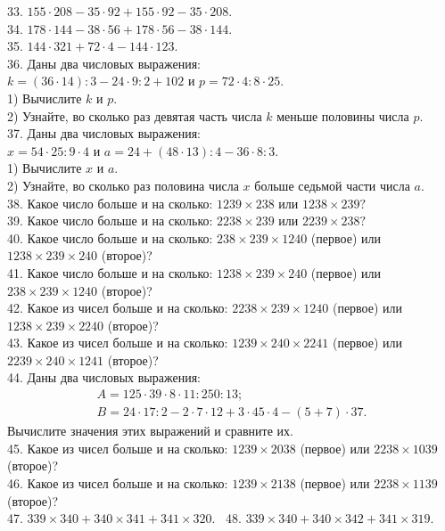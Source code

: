 \documentclass[12pt]{article}
\begin{document}
33. $155\cdot208-35\cdot92+155\cdot92-35\cdot208.$\\
34. $178\cdot144-38\cdot56+178\cdot56-38\cdot144.$\\
35. $144\cdot321+72\cdot4-144\cdot123.$\\
36. Даны два числовых выражения:\\
$k=(36\cdot14):3-24\cdot9:2+102$ и $p=72\cdot4:8\cdot25.$\\
1) Вычислите $k$ и $p.$\\
2) Узнайте, во сколько раз девятая часть числа $k$ меньше половины числа $p.$\\
37. Даны два числовых выражения:\\
$x=54\cdot25:9\cdot4$ и $a=24+(48\cdot13):4-36\cdot8:3.$\\
1) Вычислите $x$ и $a.$\\
2) Узнайте, во сколько раз половина числа $x$ больше седьмой части числа $a.$\\
38. Какое число больше и на сколько: $1239\times238$ или $1238\times239?$\\
39. Какое число больше и на сколько: $2238\times239$ или $2239\times238?$\\
40. Какое число больше и на сколько: $238\times239\times1240$ (первое) или $1238\times239\times240$ (второе)?\\
41. Какое число больше и на сколько: $1238\times239\times240$ (первое) или $238\times239\times1240$ (второе)?\\
42. Какое из чисел больше и на сколько: $2238\times239\times1240$ (первое) или $1238\times239\times2240$ (второе)?\\
43. Какое из чисел больше и на сколько: $1239\times240\times2241$ (первое) или $2239\times240\times1241$ (второе)?\\
44. Даны два числовых выражения:
$$\begin{array}{l} A=125\cdot39\cdot8\cdot11:250:13;\\ B=24\cdot17:2-2\cdot7\cdot12+3\cdot45\cdot4-(5+7)\cdot37.\end{array}$$
Вычислите значения этих выражений и сравните их.\\
45. Какое из чисел больше и на сколько: $1239\times2038$ (первое) или $2238\times1039$ (второе)?\\
46. Какое из чисел больше и на сколько: $1239\times2138$ (первое) или $2238\times1139$ (второе)?\\
47. $339 \times 340 + 340 \times 341 + 341 \times 320.$ \
48. $339 \times 340 + 340 \times 342 + 341 \times 319.$
\newpage
\end{document}
